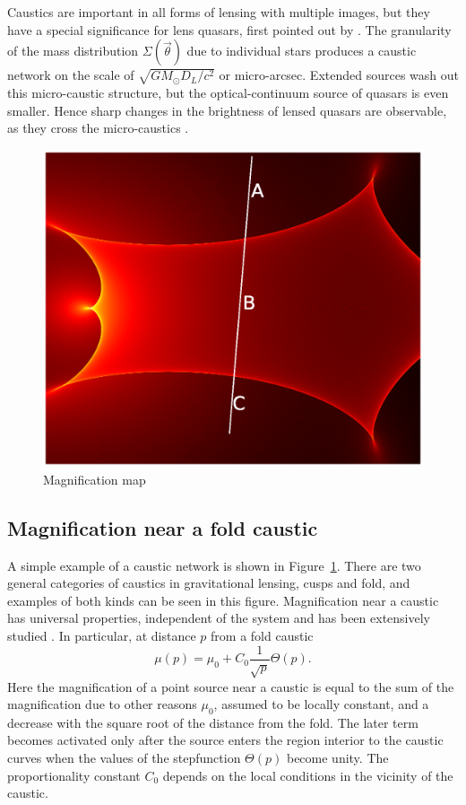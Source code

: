 Caustics are important in all forms of lensing with multiple images,
but they have a special significance for lens quasars, first pointed
out by \cite{1979Natur.282..561C}.  The granularity of the mass
distribution $\Sigma(\vec\theta)$ due to individual stars produces a
caustic network on the scale of $\sqrt{GM_\odot D_L/c^2}$ or
micro-arcsec.  Extended sources wash out this micro-caustic structure,
but the optical-continuum source of quasars is even smaller.  Hence
sharp changes in the brightness of lensed quasars are observable, as
they cross the micro-caustics \citep[e.g.,][]{2012A&A...544A..62S}.

\begin{figure}
\centering
  \includegraphics[width=.9\hsize]{plots/IRIS567_path_2.eps}
\caption{\label{fig:magnification_map} Magnification map}
\end{figure}

\subsection{Magnification near a fold caustic}

A simple example of a caustic network is shown in
Figure~\ref{fig:magnification_map}.  There are two general categories
of caustics in gravitational lensing, cusps and fold, and examples of
both kinds can be seen in this figure.  Magnification near a caustic
has universal properties, independent of the system and has been
extensively studied
\citep{1986ApJ...310..568B,1992A&A...260....1S,2002ApJ...574..970G,2002ApJ...580..468G}.
In particular, at distance $p$ from a fold caustic
\begin {equation}
 \mu(p) = \mu_0 + C_0 \frac{1}{\sqrt{p}} \Theta(p).
\end {equation}
Here the magnification of a point source near a caustic is equal to
the sum of the magnification due to other reasons $\mu_0$, assumed to
be locally constant, and a decrease with the square root of the
distance from the fold. The later term becomes activated only after
the source enters the region interior to the caustic curves when the
values of the stepfunction $\Theta(p)$ become unity. The
proportionality constant $C_0$ depends on the local conditions in the
vicinity of the caustic.

